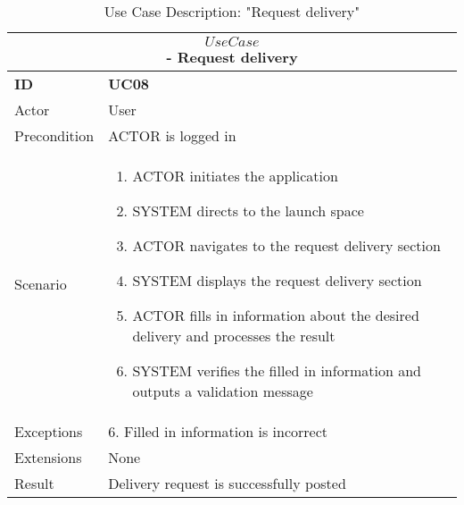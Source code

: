 \begin{center}
    \vspace{5mm}
    \begin{table}[H]
        \begin{tabular}{ |p{2cm}||p{11cm}| }
            \hline
            \multicolumn{2}{|c|}{$$Use Case$$ - Request delivery} \\ \hline
            \textbf{ID} & \textbf{UC08} \\ \hline
            Actor & User \\ \hline
            Precondition & ACTOR is logged in \\ \hline
            Scenario &
            \begin{enumerate}
                \item ACTOR initiates the application
                \item SYSTEM directs to the launch space
                \item ACTOR navigates to the request delivery section
                \item SYSTEM displays the request delivery section
                \item ACTOR fills in information about the desired delivery and processes the result
                \item SYSTEM verifies the filled in information and outputs a validation message
            \end{enumerate}
            \\ \hline 
            Exceptions & 6. Filled in information is incorrect \\ \hline
            Extensions & None \\ \hline
            Result & Delivery request is successfully posted \\ \hline
        \end{tabular}
        \caption{Use Case Description: "Request delivery"}
    \end{table}
    

\end{center}
